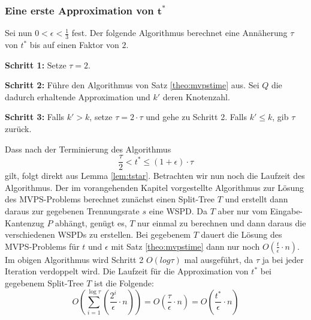 \documentclass[11pt]{article}
\begin{document}
	\subsubsection*{Eine erste Approximation von $\mathbf{t^*}$}
	
	Sei nun $0 < \epsilon < \frac{1}{3}$ fest.
	Der folgende Algorithmus berechnet eine Annäherung $\tau$ von $t^*$ bis auf einen Faktor von $2$.
	\begin{description}
		\item{\textbf{Schritt 1:}} Setze $\tau = 2$.
		\item{\textbf{Schritt 2:}} Führe den Algorithmus von Satz \ref{theo:mvpstime} aus. Sei $Q$ die dadurch erhaltende Approximation und $k'$ deren Knotenzahl.
		\item{\textbf{Schritt 3:}} Falls $k' > k$, setze $\tau = 2 \cdot \tau$ und gehe zu Schritt 2.
		Falls $k' \leq k$, gib $\tau$ zurück.
	\end{description}
	
	Dass nach der Terminierung des Algorithmus 
	\[
		\label{eq:tau}
		\frac{\tau}{2} < t^* \leq (1 + \epsilon) \cdot \tau \tag{$\ast$}
	\]
	gilt, folgt direkt aus Lemma \ref{lem:tstar}. 
	Betrachten wir nun noch die Laufzeit des Algorithmus. 
	Der im vorangehenden Kapitel vorgestellte Algorithmus zur Lösung des MVPS-Problems berechnet zunächst einen Split-Tree $T$ und erstellt dann daraus zur gegebenen Trennungsrate $s$ eine WSPD. 
	Da $T$ aber nur vom Eingabe-Kantenzug $P$ abhängt, genügt es, $T$ nur einmal zu berechnen und dann daraus die verschiedenen WSPDs zu erstellen.
	Bei gegebenem $T$ dauert die Lösung des MVPS-Problems für $t$ und $\epsilon$ mit Satz \ref{theo:mvpstime} dann nur noch $O(\frac{t}{\epsilon}\cdot n)$.
	Im obigen Algorithmus wird Schritt 2 $O(log \tau)$ mal ausgeführt, da $\tau$ ja bei jeder Iteration verdoppelt wird.
	Die Laufzeit für die Approximation von $t^*$ bei gegebenem Split-Tree $T$ ist die Folgende:
	\[
	O(\sum_{i=1}^{\log \tau} (\frac{2^i}{\epsilon}\cdot n))
	= O(\frac{\tau}{\epsilon}\cdot n)
	= O(\frac{t^*}{\epsilon}\cdot n)
	\]
	
\end{document}

